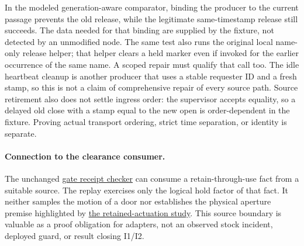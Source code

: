 \documentclass{article}
\begin{document}
In the modeled generation-aware comparator, binding the producer
to the current passage prevents the old release, while the
legitimate same-timestamp release still succeeds. The data
needed for that binding are supplied by the fixture, not detected
by an unmodified node. The same test also runs the original
local name-only release helper; that helper clears a held marker
even if invoked for the earlier occurrence of the same name.
A scoped repair must qualify that call too. The idle heartbeat
cleanup is another producer that uses a stable requester ID
and a fresh stamp, so this is not a claim of comprehensive
repair of every source path. Source retirement also does
not settle ingress order: the supervisor accepts equality,
so a delayed old close with a stamp equal to the new open is
order-dependent in the fixture. Proving actual transport
ordering, strict time separation, or identity is separate.

\paragraph{Connection to the clearance consumer.}
The unchanged \href{https://github.com/eternal-november/eos-research-programmes/pull/809}{gate receipt checker}
can consume a retain-through-use fact from a suitable source.
The replay exercises only the logical hold factor of that
fact. It neither samples the motion of a door nor establishes
the physical aperture premise highlighted by
\href{https://github.com/eternal-november/eos-research-programmes/pull/810}{the retained-actuation study}.
This source boundary is valuable as a proof obligation
for adapters, not an observed stock incident, deployed guard,
or result closing I1/I2.
\end{document}
